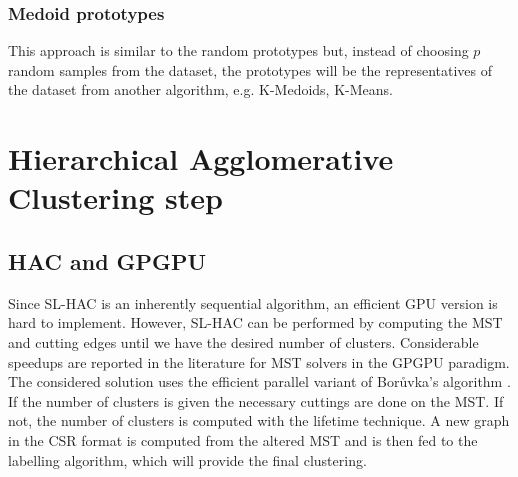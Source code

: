\subsubsection{Medoid prototypes}
This approach is similar to the random prototypes but, instead of choosing $p$ random samples from the dataset, the prototypes will be the representatives of the dataset from another algorithm, e.g. K-Medoids, K-Means.

\section{Hierarchical Agglomerative Clustering step}

\subsection{HAC and GPGPU}
Since SL-HAC is an inherently sequential algorithm, an efficient GPU version is hard to implement.
However, SL-HAC can be performed by computing the MST and cutting edges until we have the desired number of clusters.
Considerable speedups are reported in the literature for MST solvers in the GPGPU paradigm.
The considered solution uses the efficient parallel variant of Borůvka's algorithm \cite{Sousa2015}. 
If the number of clusters is given the necessary cuttings are done on the MST. 
If not, the number of clusters is computed with the lifetime technique. 
A new graph in the CSR format is computed from the altered MST and is then fed to the labelling algorithm, which will provide the final clustering.

